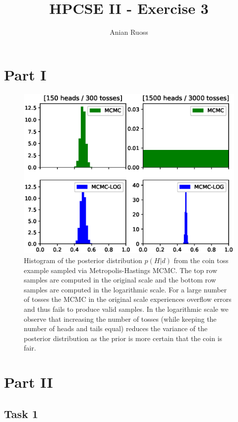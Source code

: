 \documentclass{article}
\begin{document}
    \title{HPCSE II - Exercise 3}
    \author{Anian Ruoss}
    \maketitle

    \section*{Part I}
    \label{sec:PartI}

    \begin{figure}[H]
        \begin{center}
            \includegraphics[width=.75\textwidth]{plots/coin_toss.eps}
        \end{center}
        \caption{Histogram of the posterior distribution
        $p \left( H | d \right)$ from the coin toss example sampled via
        Metropolis-Hastings MCMC.
        The top row samples are computed in the original scale and the
        bottom row samples are computed in the logarithmic scale.
        For a large number of tosses the MCMC in the original scale
        experiences overflow errors and thus fails to produce valid samples.
        In the logarithmic scale we observe that increasing the number of
        tosses (while keeping the number of heads and tails equal) reduces
        the variance of the posterior distribution as the prior is more
        certain that the coin is fair.
        }
    \end{figure}

    \section*{Part II}
    \label{sec:PartII}

    \subsection*{Task 1}
    \label{subsec:Task1}
\end{document}
